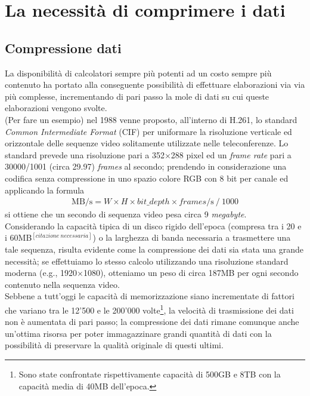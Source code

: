 
\chapter{La necessità di comprimere i dati} %

\label{Chapter3}



\section{Compressione dati}
La disponibilità di calcolatori sempre più potenti ad un costo sempre più
contenuto ha portato alla conseguente possibilità di effettuare elaborazioni
via via più complesse, incrementando di pari passo la mole di dati su cui
queste elaborazioni vengono svolte. \\
(Per fare un esempio) nel 1988 venne proposto, all'interno di H.261, lo standard
\emph{Common Intermediate Format} (CIF) per uniformare la risoluzione verticale
ed orizzontale delle sequenze video solitamente utilizzate nelle teleconferenze.
Lo standard prevede una risoluzione pari a 352${\times}$288 pixel ed un
\emph{frame rate} pari a 30000/1001 (circa 29.97) \emph{frames} al secondo;
prendendo in considerazione una codifica senza compressione in uno spazio
colore RGB con 8 bit per canale ed applicando la formula
\begin{align*}
  \text{MB}\!/\!\text{s} = 
  W \times H \times bit\_depth \times frames\!/\!\text{s} \:/\: 1000
\end{align*}
si ottiene che un secondo di sequenza video pesa circa 9 \emph{megabyte}. \\
Considerando la capacità tipica di un disco rigido dell'epoca (compresa
tra i 20 e i 60MB$^{[citazione\: necessaria]}$) o la larghezza di banda 
necessaria a trasmettere una tale sequenza, risulta evidente come la 
compressione dei dati sia stata una grande necessità; se effettuiamo lo stesso 
calcolo utilizzando una risoluzione standard moderna (e.g., 1920$\times$1080), 
otteniamo un peso di circa 187MB per ogni secondo contenuto nella sequenza 
video. \\
Sebbene a tutt'oggi le capacità di memorizzazione siano incrementate di fattori
che variano tra le 12'500 e le 200'000 volte\footnote{Sono state confrontate
rispettivamente capacità di 500GB e 8TB con la capacità media di 40MB 
dell'epoca.}, la velocità di trasmissione dei dati non è aumentata di pari 
passo; la compressione dei dati rimane comunque anche un'ottima risorsa per
poter immagazzinare grandi quantità di dati con la possibilità di preservare
la qualità originale di questi ultimi.
